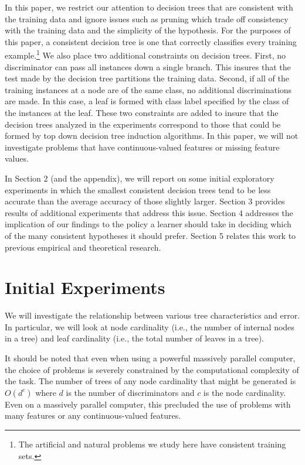 In this paper, we restrict our attention to decision trees that
are consistent with the training data and ignore issues such as
pruning which trade off consistency with the training data and the
simplicity of the hypothesis. For the purposes of this paper, a
consistent decision tree is one that correctly classifies every
training example.\footnote{The artificial and natural problems we study
here have consistent training sets.}  We also place two additional
constraints on decision trees.  First, no discriminator can pass all
instances down a single branch.  This insures that the test made by
the decision tree partitions the training data. Second, if all of the
training instances at a node are of the same class, no additional
discriminations are made.  In this case, a leaf is formed with class
label specified by the class of the instances at the leaf. These two
constraints are added to insure that the decision trees analyzed in
the experiments correspond to those that could be formed by top down
decision tree induction algorithms. In this paper, we will not
investigate problems that have continuous-valued features or missing
feature values.

In Section 2 (and the appendix), we will report on some initial
exploratory experiments in which the smallest
consistent decision trees tend to be less accurate than the average
accuracy of those slightly larger.  Section 3 provides results of
additional experiments that address this issue.  Section 4 addresses
the implication of our findings to the policy a learner should take in
deciding which of the many consistent hypotheses it should prefer.
Section 5 relates this work to previous empirical and theoretical
research.

\section{Initial Experiments}

We will investigate the relationship between various tree
characteristics and error.  In particular, we will look at node
cardinality (i.e., the number of internal nodes in a tree) and leaf
cardinality (i.e., the total number of leaves in a tree).

It should be noted that even when using a powerful massively parallel
computer, the choice of problems is severely constrained by the
computational complexity of the task.  The number of trees of any node
cardinality that might be generated is $O(d^{c})$ where $d$ is the 
number of discriminators and $c$ is the node cardinality.  Even on a
massively parallel computer, this precluded the use of problems with
many features or any continuous-valued features.

